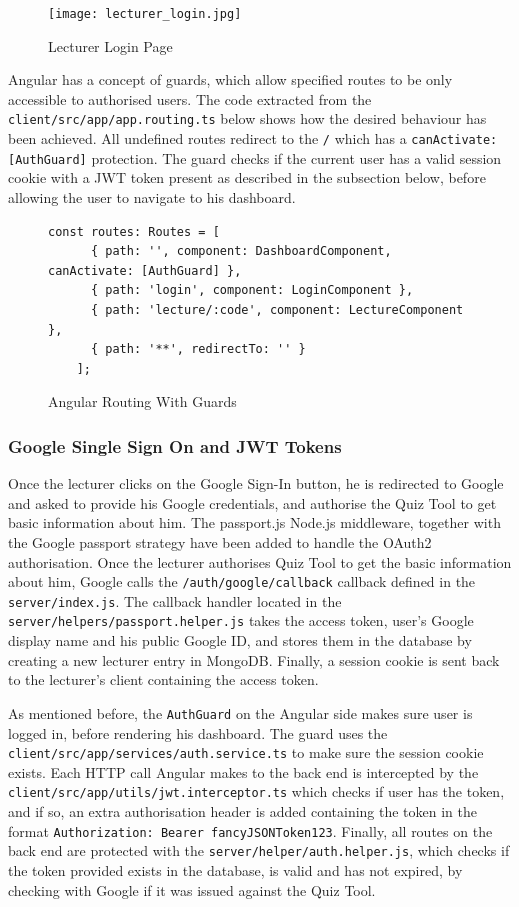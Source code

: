 \begin{figure}[h!]
    \centering
    \texttt{[image: lecturer\_login.jpg]}
    \caption{Lecturer Login Page}
    \label{fig:lecturerlogin}
\end{figure}

Angular has a concept of guards, which allow specified routes to be only accessible to
authorised users. The code extracted from the \texttt{client/src/app/app.routing.ts} below
shows how the desired behaviour has been achieved. All undefined routes redirect to the \texttt{/}
which has a \texttt{canActivate: [AuthGuard]} protection. The guard checks if the current user has a
valid session cookie with a JWT token\cite{44} present as described in the subsection below, before allowing
the user to navigate to his dashboard.

\begin{figure}[h!]
    \begin{lstlisting}[basicstyle=\small]
    const routes: Routes = [
      { path: '', component: DashboardComponent, canActivate: [AuthGuard] },
      { path: 'login', component: LoginComponent },
      { path: 'lecture/:code', component: LectureComponent },
      { path: '**', redirectTo: '' }
    ];
    \end{lstlisting}
    \caption{Angular Routing With Guards}
    \label{fig:auth}
\end{figure}

\subsubsection{Google Single Sign On and JWT Tokens}
Once the lecturer clicks on the Google Sign-In button, he is redirected to Google
and asked to provide his Google credentials, and authorise the Quiz Tool to get
basic information about him. The passport.js\cite{45} Node.js middleware, together
with the Google passport strategy\cite{46} have been added to handle the OAuth2\cite{47} authorisation.
Once the lecturer authorises Quiz Tool to get the basic information about him, Google calls the
\texttt{/auth/google/callback} callback defined in the \texttt{server/index.js}. The callback
handler located in the \texttt{server/helpers/passport.helper.js} takes the access token, user's
Google display name and his public Google ID, and stores them in the database by creating a new
lecturer entry in MongoDB. Finally, a session cookie is sent back to the lecturer's client
containing the access token.

As mentioned before, the \texttt{AuthGuard} on the Angular side makes sure user is logged in, before
rendering his dashboard. The guard uses the \texttt{client/src/app/services/auth.service.ts} to make
sure the session cookie exists. Each HTTP call Angular makes to the back end is intercepted by
the \texttt{client/src/app/utils/jwt.interceptor.ts} which checks if user has the token, and if so,
an extra authorisation header is added containing the token in the format \texttt{Authorization: Bearer fancyJSONToken123}.
Finally, all routes on the back end are protected with the \texttt{server/helper/auth.helper.js}, which
checks if the token provided exists in the database, is valid and has not expired, by checking with Google if it was issued
against the Quiz Tool.

